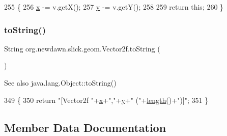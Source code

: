 \begin{DoxyCode}
255     \{
256         \mbox{\hyperlink{classorg_1_1newdawn_1_1slick_1_1geom_1_1_vector2f_a3c72cdf13ebc511a472e1a02002fa579}{x}} -= v.getX(); 
257         \mbox{\hyperlink{classorg_1_1newdawn_1_1slick_1_1geom_1_1_vector2f_aa03914f0c3d32063aa90e5bd7b74688e}{y}} -= v.getY();
258         
259         \textcolor{keywordflow}{return} \textcolor{keyword}{this};
260     \}
\end{DoxyCode}
\mbox{\label{classorg_1_1newdawn_1_1slick_1_1geom_1_1_vector2f_ad5fb60f8d54de85fb1c8f15ef10ee9b7}} 
\subsubsection{\texorpdfstring{to\+String()}{toString()}}
{\footnotesize\ttfamily String org.\+newdawn.\+slick.\+geom.\+Vector2f.\+to\+String (\begin{DoxyParamCaption}{ }\end{DoxyParamCaption})\hspace{0.3cm}{\ttfamily [inline]}}

\begin{DoxySeeAlso}{See also}
java.\+lang.\+Object\+::to\+String() 
\end{DoxySeeAlso}

\begin{DoxyCode}
349                              \{
350         \textcolor{keywordflow}{return} \textcolor{stringliteral}{"[Vector2f "}+\mbox{\hyperlink{classorg_1_1newdawn_1_1slick_1_1geom_1_1_vector2f_a3c72cdf13ebc511a472e1a02002fa579}{x}}+\textcolor{stringliteral}{","}+\mbox{\hyperlink{classorg_1_1newdawn_1_1slick_1_1geom_1_1_vector2f_aa03914f0c3d32063aa90e5bd7b74688e}{y}}+\textcolor{stringliteral}{" ("}+\mbox{\hyperlink{classorg_1_1newdawn_1_1slick_1_1geom_1_1_vector2f_ada298fe38d235371020523e9655e9152}{length}}()+\textcolor{stringliteral}{")]"};
351     \}
\end{DoxyCode}


\subsection{Member Data Documentation}
\mbox{\label{classorg_1_1newdawn_1_1slick_1_1geom_1_1_vector2f_a5d55b062f6a2eb4893390a9a99730f5f}} 

